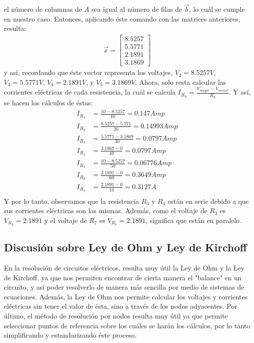 \documentclass[12pt, letterpaper]{report}
\begin{document}
el número de columnas de $A$ sea igual al número de filas de $\vec{b}$, lo cuál se cumple en nuestro caso. Entonces, aplicando éste comando con las matrices anteriores, 
resulta: 
\begin{align}
\vec{x} = \begin{bmatrix}
8.5257\\ 
5.5771\\ 
2.1891\\
3.1869
\end{bmatrix}
\end{align}y así, recordando que éste vector representa los voltajes, $V_2 = 8.5257V$, $V_3 = 5.5771V$, 
$V_4 = 2.1891V$, y $V_5 = 3.1869V$. Ahora, solo resta calcular las corrientes eléctricas de cada resistencia, la cuál se calcula $I_{R_n} = \frac{V_{mayor} - V_{menor}}{R_n}$. Y así, se hacen los cálculos de éstas: 
\begin{align}
I_{R_1} &= \frac{10 - 8.5257}{10} = 0.147Amp\\ 
I_{R_2} &= \frac{8.5257 - 5.771}{20} = 0.14993Amp\\ 
I_{R_3} &= \frac{5.5771 - 3.1869}{30} = 0.0797Amp\\ 
I_{R_4} &= \frac{3.1869 - 0}{40} = 0.0797Amp\\ 
I_{R_5} &= \frac{10 - 8.5257}{50} = 0.06776Amp\\ 
I_{R_6} &= \frac{2.1891 - 0}{60} = 0.3649Amp\\
I_{R_7} &= \frac{2.1891 - 0}{10} = 0.3127A\\  
\end{align}Y por lo tanto, observamos que la resistencia $R_3$ y $R_4$ están en serie debido a que sus corrientes eléctricas son las mismas. Además, como el voltaje de $R_3$ es $V_{R_3} = 2.1891$ y el voltaje de $R_7$ es 
$V_{R_7} = 2.1891$, significa que están en paralelo. 
\subsection*{Discusión sobre Ley de Ohm y Ley de Kirchoff}
En la resolución de circuitos eléctricos, resulta muy útil la Ley de Ohm y la Ley de Kirchoff, ya que nos permiten encontrar de cierta manera el 
"balance" en un circuito, y así poder resolverlo de manera más sencilla por medio de sistemas de ecuaciones. Además, la Ley de Ohm nos permite calcular los voltajes y corrientes eléctricas sin 
tener el valor de ésta, sino a través de los nodos adyacentes. Por último, el método de resolución por nodos resulta muy útil ya que 
permite seleccionar puntos de referencia sobre los cuáles se harán los cálculos, por lo tanto simplificando y estandarizando éste proceso. 
\end{document}
